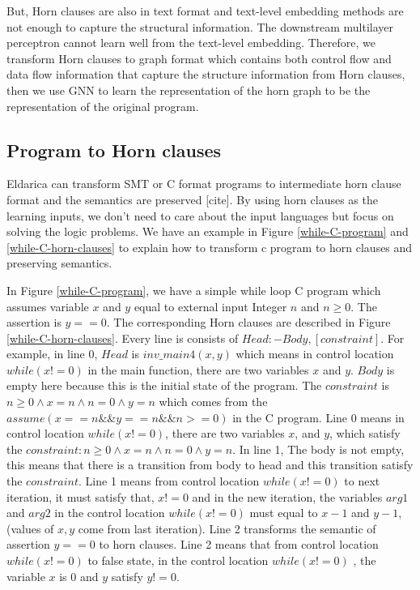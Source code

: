 \documentclass{article}
\begin{document}
But, Horn clauses are also in text format and text-level embedding methods \cite{mikolov2013efficient} are not enough to capture the structural information. The downstream multilayer perceptron cannot learn well from the text-level embedding. Therefore, we transform Horn clauses to graph format which contains both control flow and data flow information that capture the structure information from Horn clauses, then we use GNN to learn the representation of the horn graph to be the representation of the original program.


\subsection{Program to Horn clauses}
Eldarica can transform SMT or C format programs to intermediate horn clause format and the semantics are preserved [cite].  By using horn clauses as the learning inputs, we don't need to care about the input languages but focus on solving the logic problems. We have an example in Figure \ref{while-C-program} and \ref{while-C-horn-clauses} to explain how to transform c program to horn clauses and preserving semantics.

In Figure \ref{while-C-program}, we have a simple while loop C program which assumes variable $x$ and $y$ equal to external input Integer $n$ and $n\geq 0$. The assertion is $y==0$. The corresponding Horn clauses are described in  Figure \ref{while-C-horn-clauses}. Every line is consists of $Head:-Body,[constraint]$. For example, in line 0, $Head$ is $inv\_main4(x, y)$ which means in control location $while(x!=0)$ in the main function, there are two variables $x$ and $y$. $Body$ is empty here because this is the initial state of the program. The $constraint$ is $n \geq 0 \wedge x = n \wedge n = 0 \wedge y = n$ which comes from the $assume(x==n\&\&y==n\&\&n>=0)$ in the C program. Line 0 means in control location $while(x!=0)$, there are two variables $x$, and $y$, which satisfy the $constraint: n \geq 0 \wedge x = n \wedge n = 0 \wedge y = n$. In line 1, The body is not empty, this means that there is a transition from body to head and this transition satisfy the $constraint$. Line 1 means from control location $while(x!=0)$ to next iteration, it must satisfy that, $x!=0$ and in the new iteration, the variables $arg1$ and $arg2$ in the control location $while(x!=0)$ must equal to $x-1$ and $y-1$, (values of $x,y$ come from last iteration). Line 2 transforms the semantic of assertion $y==0$ to horn clauses. Line 2 means that from control  location $while(x!=0)$ to false state, in the control location $while(x!=0)$ , the variable $x$ is 0 and $y$ satisfy $y!=0$.
\end{document}
